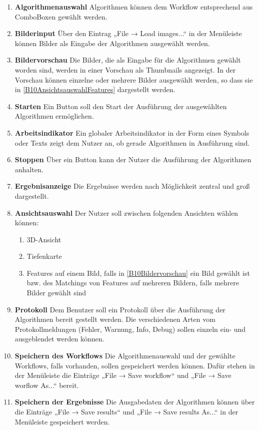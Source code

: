 \begin{enumerate}[ align=left, label={\textbf{\textbackslash B10\arabic*0\textbackslash}} ]
	\item \textbf{Algorithmenauswahl} Algorithmen können dem Workflow entsprechend aus ComboBoxen gewählt werden.
	\item \textbf{Bilderinput} Über den Eintrag „File → Load images...“ in der Menüleiste können Bilder als Eingabe der Algorithmen ausgewählt werden.
	\item \textbf{Bildervorschau} \label{B10Bildervorschau} Die Bilder, die als Eingabe für die Algorithmen gewählt worden sind, werden in einer Vorschau als Thumbnails angezeigt. In der Vorschau können einzelne oder mehrere Bilder ausgewählt werden, so dass sie in \ref{B10AnsichtsauswahlFeatures} dargestellt werden.
	\item \textbf{Starten} \label{B10Starten} Ein Button soll den Start der Ausführung der ausgewählten Algorithmen ermöglichen.
	\item \textbf{Arbeitsindikator} \label{B10Arbeitsindikator} Ein globaler Arbeitsindikator in der Form eines Symbols oder Texts zeigt dem Nutzer an, ob gerade Algorithmen in Ausführung sind.
	\item \textbf{Stoppen} Über ein Button kann der Nutzer die Ausführung der Algorithmen anhalten.
	\item \textbf{Ergebnisanzeige} Die Ergebnisse werden nach Möglichkeit zentral und groß dargestellt.
	\item \textbf{Ansichtsauswahl} Der Nutzer soll zwischen folgenden Ansichten wählen können:
		\begin{enumerate}[ label={\textbf{\alph*}}, ref={\textbf{\textbackslash B10\arabic{enumi}0\textbackslash\alph*}} ]
			\item 3D-Ansicht
			\item Tiefenkarte
			\item \label{B10AnsichtsauswahlFeatures} Features auf einem Bild, falls in \ref{B10Bildervorschau} ein Bild gewählt ist bzw. des Matchings von Features auf mehreren Bildern, falls mehrere Bilder gewählt sind
		\end{enumerate}
	\item \textbf{Protokoll} Dem Benutzer soll ein Protokoll über die Ausführung der Algorithmen bereit gestellt werden. Die verschiedenen Arten vom Protokollmeldungen (Fehler, Warnung, Info, Debug) sollen einzeln ein- und ausgeblendet werden können.
	\item \textbf{Speichern des Workflows} Die Algorithmenauswahl und der gewählte Workflows, falls vorhanden, sollen gespeichert werden können. Dafür stehen in der Menüleiste die Einträge „File → Save workflow“ und „File → Save worflow As...“ bereit.
	\item \textbf{Speichern der Ergebnisse} Die Ausgabedaten der Algorithmen können über die Einträge „File → Save results“ und „File → Save results As...“ in der Menüleiste gespeichert werden.
\end{enumerate}

